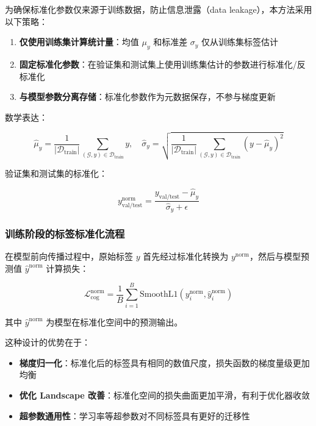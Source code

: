 \documentclass[UTF8, a4paper, 12pt]{article}
\begin{document}
为确保标准化参数仅来源于训练数据，防止信息泄露（data leakage），本方法采用以下策略：

\begin{enumerate}
    \item \textbf{仅使用训练集计算统计量}：均值 $\mu_y$ 和标准差 $\sigma_y$ 仅从训练集标签估计
    \item \textbf{固定标准化参数}：在验证集和测试集上使用训练集估计的参数进行标准化/反标准化
    \item \textbf{与模型参数分离存储}：标准化参数作为元数据保存，不参与梯度更新
\end{enumerate}

数学表达：

\begin{equation}
\hat{\mu}_y = \frac{1}{|\mathcal{D}_{\text{train}}|} \sum_{(\mathcal{G}, y) \in \mathcal{D}_{\text{train}}} y, \quad \hat{\sigma}_y = \sqrt{\frac{1}{|\mathcal{D}_{\text{train}}|} \sum_{(\mathcal{G}, y) \in \mathcal{D}_{\text{train}}} (y - \hat{\mu}_y)^2}
\end{equation}

验证集和测试集的标准化：

\begin{equation}
y_{\text{val/test}}^{\text{norm}} = \frac{y_{\text{val/test}} - \hat{\mu}_y}{\hat{\sigma}_y + \epsilon}
\end{equation}

\subsubsection{训练阶段的标签标准化流程}

在模型前向传播过程中，原始标签 $y$ 首先经过标准化转换为 $y^{\text{norm}}$，然后与模型预测值 $\hat{y}^{\text{norm}}$ 计算损失：

\begin{equation}
\mathcal{L}_{\text{cog}}^{\text{norm}} = \frac{1}{B} \sum_{i=1}^{B} \text{SmoothL1}\left(y_i^{\text{norm}}, \hat{y}_i^{\text{norm}}\right)
\end{equation}

其中 $\hat{y}^{\text{norm}}$ 为模型在标准化空间中的预测输出。

这种设计的优势在于：

\begin{itemize}
    \item \textbf{梯度归一化}：标准化后的标签具有相同的数值尺度，损失函数的梯度量级更加均衡
    \item \textbf{优化 Landscape 改善}：标准化空间的损失曲面更加平滑，有利于优化器收敛
    \item \textbf{超参数通用性}：学习率等超参数对不同标签具有更好的迁移性
\end{itemize}
\end{document}
